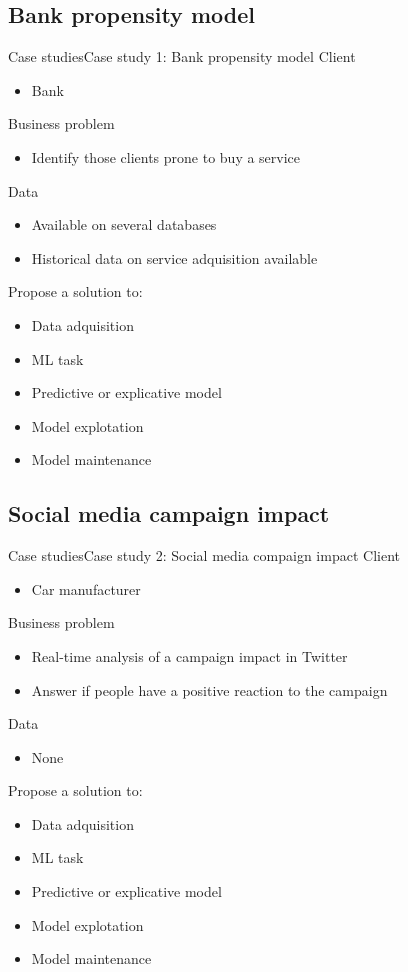 \documentclass[10pt,compress]{beamer} %
\begin{document}
\subsection{Bank propensity model}
\begin{frame}{Case studies}{Case study 1: Bank propensity model}
	Client
	\begin{itemize}
		\item Bank
	\end{itemize}
	Business problem
	\begin{itemize}
		\item Identify those clients prone to buy a service
	\end{itemize}
	Data
	\begin{itemize}
		\item Available on several databases
		\item Historical data on service adquisition available
	\end{itemize}
	Propose a solution to:
	\begin{itemize}
		\item Data adquisition
		\item ML task
		\item Predictive or explicative model
		\item Model explotation
		\item Model maintenance
	\end{itemize}
\end{frame}

\subsection{Social media campaign impact}
\begin{frame}{Case studies}{Case study 2: Social media compaign impact}
	Client
	\begin{itemize}
		\item Car manufacturer
	\end{itemize}
	Business problem
	\begin{itemize}
		\item Real-time analysis of a campaign impact in Twitter
		\item Answer if people have a positive reaction to the campaign
	\end{itemize}
	Data
	\begin{itemize}
		\item None
	\end{itemize}
	Propose a solution to:
	\begin{itemize}
		\item Data adquisition
		\item ML task
		\item Predictive or explicative model
		\item Model explotation
		\item Model maintenance
	\end{itemize}
\end{frame}
\end{document}
